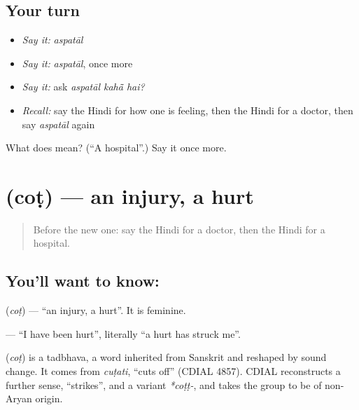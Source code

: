 \subsection*{Your turn}
\begin{itemize}
\raggedright
  \item \emph{Say it:} \emph{aspatāl}
  \item \emph{Say it:} \emph{aspatāl}, once more
  \item \emph{Say it:} ask \emph{aspatāl kahā̃ hai?}
  \item \emph{Recall:} say the Hindi for how one is feeling, then the Hindi for a doctor, then say \emph{aspatāl} again
\end{itemize}

\begin{tcolorbox}[breakable,colback=teal!4,colframe=teal!35!black,title={Before you move on}]
What does  mean? (\textquotedblleft{}A hospital\textquotedblright{}.) Say it once more.
\end{tcolorbox}
\section[\texorpdfstring{\hi{चोट} (coṭ)}{चोट (coṭ)}]{ (coṭ) — an injury, a hurt}

\label{lesson:HI-C107-chot}



\begin{quote}
Before the new one: say the Hindi for a doctor, then the Hindi for a hospital.
\end{quote}

\subsection*{You'll want to know: }
\textbf{} (\emph{coṭ}) — \textquotedblleft{}an injury, a hurt\textquotedblright{}. It is feminine.

\textbf{   } — \textquotedblleft{}I have been hurt\textquotedblright{}, literally \textquotedblleft{}a hurt has struck me\textquotedblright{}.

\begin{cousinweb}
\textbf{} (\emph{coṭ}) is a tadbhava, a word inherited from Sanskrit and reshaped by sound change. It comes from \emph{cuṭati}, \textquotedblleft{}cuts off\textquotedblright{} (CDIAL 4857). CDIAL reconstructs a further sense, \textquotedblleft{}strikes\textquotedblright{}, and a variant \emph{*coṭṭ-}, and takes the group to be of non-Aryan origin.
\end{cousinweb}


